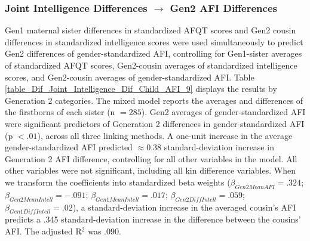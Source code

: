 \subsubsection{Joint Intelligence Differences $\rightarrow$ Gen2 AFI Differences}
Gen1 maternal sister differences in standardized AFQT scores and Gen2 cousin differences in standardized intelligence scores were used simultaneously to predict Gen2 differences of gender-standardized AFI, controlling for Gen1-sister averages of standardized AFQT scores, Gen2-cousin averages of standardized intelligence scores, and Gen2-cousin averages of gender-standardized AFI. Table \ref{table_Dif_Joint_Intelligence_Dif_Child_AFI_9} displays the results by Generation 2 categories. The mixed model reports the averages and differences of the firstborns of each sister (n $= 285$). Gen2 averages of gender-standardized AFI were significant predictors of Generation 2 differences in gender-standardized AFI (p $< .01$), across all three linking methods. A one-unit increase in the average gender-standardized AFI predicted $\approx 0.38$ standard-deviation increase in Generation 2 AFI difference, controlling for all other variables in the model. All other variables were not significant, including all kin difference variables. When we transform the coefficients into standardized beta weights ($\beta_{Gen2 Mean AFI} = .324$; $\beta_{Gen2 Mean Intell} = -.091$; $\beta_{Gen1 Mean Intell} = .017$; $\beta_{Gen2 Diff Intell} = .059$; $\beta_{Gen1 Diff Intell} = .02$), a standard-deviation increase in the averaged cousin's AFI predicts a .345 standard-deviation increase in the difference between the cousins' AFI. The adjusted R$^{2}$ was $.090$.\\
